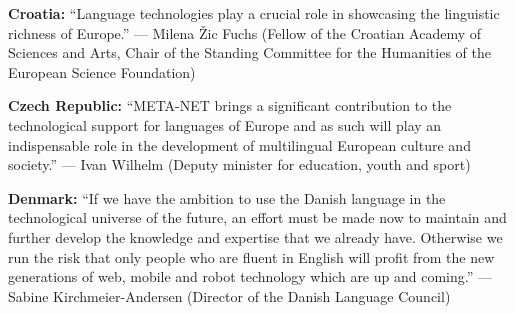 \documentclass[10pt, plain]{../../metanetpaper}
\begin{document}
\maketitle

\cleardoublepage

\makefundingnotice

\cleardoublepage




\textbf{Croatia:} ``Language technologies play a crucial role in showcasing the linguistic richness of Europe.'' --- Milena Žic Fuchs (Fellow of the Croatian Academy of Sciences and Arts, Chair of the Standing Committee for the Humanities of the European Science Foundation)

\medskip \textbf{Czech Republic:} ``META-NET brings a significant contribution to the technological support for languages of Europe and as such will play an indispensable role in the development of multilingual European culture and society.'' --- Ivan Wilhelm (Deputy minister for education, youth and sport)

\medskip \textbf{Denmark:} ``If we have the ambition to use the Danish language in the technological universe of the future, an effort must be made now to maintain and further develop the knowledge and expertise that we already have. Otherwise we run the risk that only people who are fluent in English will profit from the new generations of web, mobile and robot technology which are up and coming.'' --- Sabine Kirchmeier-Andersen (Director of the Danish Language Council)

\end{document}
